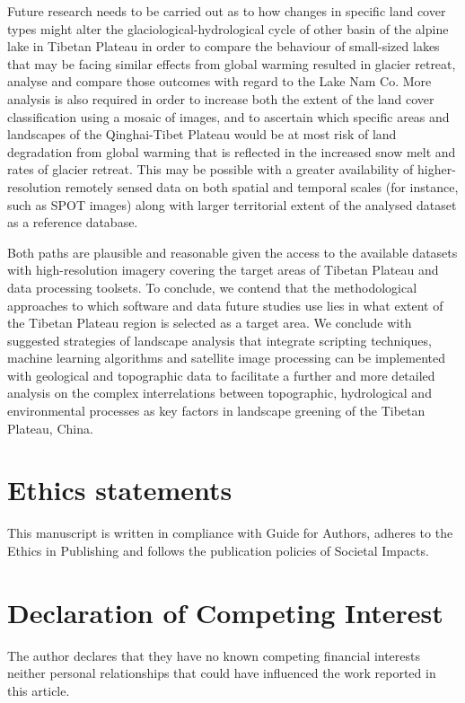 \documentclass[final,5p,times,twocolumn]{elsarticle}
\begin{document}
Future research needs to be carried out as to how changes in specific land cover types might alter the glaciological-hydrological cycle of other basin of the alpine lake in Tibetan Plateau in order to compare the behaviour of small-sized lakes that may be facing similar effects from global warming resulted in glacier retreat, analyse and compare those outcomes with regard to the Lake Nam Co. More analysis is also required in order to increase both the extent of the land cover classification using a mosaic of images, and to ascertain which specific areas and landscapes of the Qinghai-Tibet Plateau would be at most risk of land degradation from global warming that is reflected in the increased snow melt and rates of glacier retreat. This may be possible with a greater availability of higher-resolution remotely sensed data on both spatial and temporal scales (for instance, such as SPOT images) along with larger territorial extent of the analysed dataset as a reference database. 

Both paths are plausible and reasonable given the access to the available datasets with high-resolution imagery covering the target areas of Tibetan Plateau and data processing toolsets. To conclude, we contend that the methodological approaches to which software and data future studies use lies in what extent of the Tibetan Plateau region is selected as a target area. We conclude with suggested strategies of landscape analysis that integrate scripting techniques, machine learning algorithms and satellite image processing can be implemented with geological and topographic data to facilitate a further and more detailed analysis on the complex interrelations between topographic, hydrological and environmental processes as key factors in landscape greening of the Tibetan Plateau, China.

\section{Ethics statements}

This manuscript is written in compliance with Guide for Authors, adheres to the Ethics in Publishing and follows the publication policies of Societal Impacts.

\section{Declaration of Competing Interest}

The author declares that they have no known competing financial interests neither personal relationships that could have influenced the work reported in this article.
\end{document}
